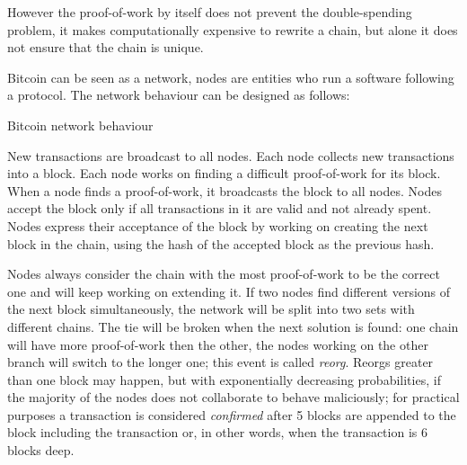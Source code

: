 However the proof-of-work by itself does not prevent the double-spending problem, it makes computationally expensive to rewrite a chain, but alone it does not ensure that the chain is unique.

Bitcoin can be seen as a network, nodes are entities who run a software following a protocol. The network behaviour can be designed as follows:

\begin{algorithm}
	\caption{Bitcoin network behaviour}
	\begin{algorithmic}[1]
		\State New transactions are broadcast to all nodes.
		\State Each node collects new transactions into a block.
		\State Each node works on finding a difficult proof-of-work for its block.
		\State When a node finds a proof-of-work, it broadcasts the block to all nodes.
		\State Nodes accept the block only if all transactions in it are valid and not already spent.
		\State  Nodes express their acceptance of the block by working on creating the next block in the chain, using the hash of the accepted block as the previous hash. %
	\end{algorithmic}
\end{algorithm}  

Nodes always consider the chain with the most proof-of-work to be the correct one and will keep working on extending it.
If two nodes find different versions of the next block simultaneously, the network will be split into two sets with different chains. 
The tie will be broken when the next solution is found: one chain will have more proof-of-work then the other, the nodes working on the other branch will switch to the longer one; this event is called \textit{reorg}. 
Reorgs greater than one block may happen, but with exponentially decreasing probabilities, if the majority of the nodes does not collaborate to behave maliciously; for practical purposes a transaction is considered \textit{confirmed} after 5 blocks are appended to the block including the transaction or, in other words, when the transaction is 6 blocks deep.

